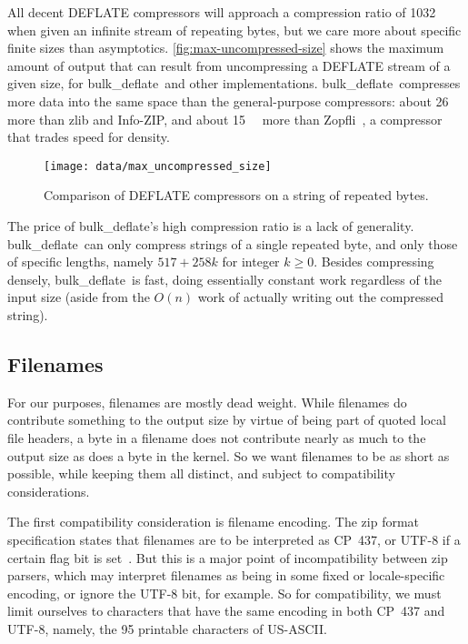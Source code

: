 \documentclass[letterpaper,twocolumn,10pt]{article}
\newcommand{\kB}{\kilo\byte}
\newcommand{\bulkdeflate}{\mbox{bulk\_deflate}}
\begin{document}
All decent DEFLATE compressors will approach a compression ratio of \num{1032}
when given an infinite stream of repeating bytes,
but we care more about specific finite sizes
than asymptotics.
\autoref{fig:max-uncompressed-size} shows the
maximum amount of output
that can result from uncompressing a DEFLATE stream of a given size,
for \bulkdeflate\ and other implementations.
\bulkdeflate\ compresses more data
into the same space than the general-purpose compressors:
about \SI{26}{\kB} more than zlib and Info-ZIP,
and about \SI{15}{\kB} more than Zopfli~\cite{zopfli},
a compressor that trades speed for density.

\begin{figure}
\texttt{[image: data/max\_uncompressed\_size]}
\caption{
Comparison of DEFLATE compressors
on a string of repeated bytes.
}
\label{fig:max-uncompressed-size}
\end{figure}

The price of \bulkdeflate's high compression ratio is a lack of generality.
\bulkdeflate\ can only compress strings of a single repeated byte,
and only those of specific lengths,
namely $517 + 258 k$ for integer $k \ge 0$.
Besides compressing densely, \bulkdeflate\ is fast,
doing essentially constant work regardless of the input size
(aside from the $O(n)$ work of actually writing out the compressed string).

\subsection{Filenames}
\label{sec:filenames}

For our purposes, filenames are mostly dead weight.
While filenames do contribute something to the output size
by virtue of being part of quoted local file headers,
a byte in a filename does not contribute nearly as much to the output size
as does a byte in the kernel.
So we want filenames to be as short as possible,
while keeping them all distinct,
and subject to compatibility considerations.

The first compatibility consideration is filename encoding.
The zip format specification states that filenames
are to be interpreted as CP~437,
or \mbox{UTF-8} if a certain flag bit is set~\cite[Appendix~D]{appnote}.
But this is a major point of incompatibility
between zip parsers,
which may interpret filenames as being in
some fixed or locale-specific encoding, or ignore the \mbox{UTF-8} bit, for example.
So for compatibility, we must limit ourselves to characters
that have the same encoding in both
CP~437 and \mbox{UTF-8},
namely, the \num{95} printable characters of \mbox{US-ASCII}.
\end{document}
